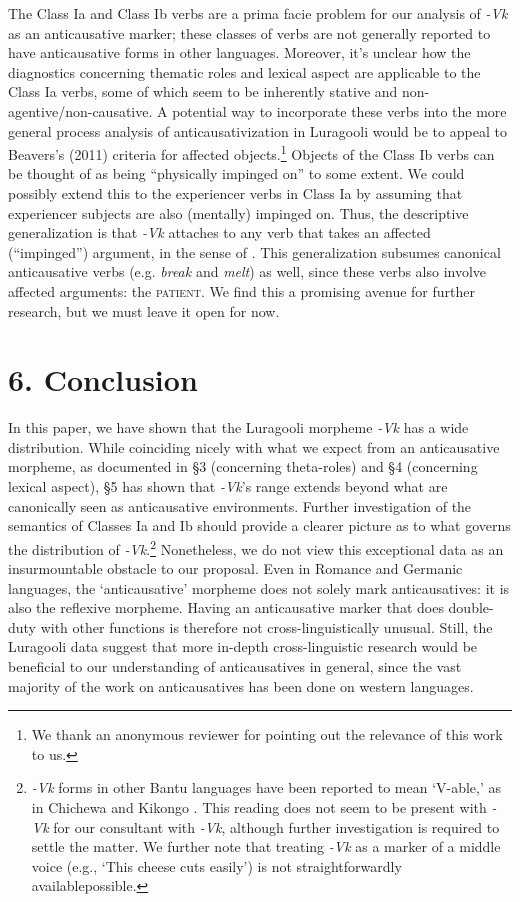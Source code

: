 \documentclass[output=paper]{langsci/langscibook}
\begin{document}
The Class Ia and Class Ib verbs are a prima facie problem for our analysis of \textit{{}-Vk} as an anticausative marker; these classes of verbs are not generally reported to have anticausative forms in other languages. Moreover, it’s unclear how the diagnostics concerning thematic roles and lexical aspect are applicable to the Class Ia verbs, some of which seem to be inherently stative and non-agentive/non-causative. A potential way to incorporate these verbs into the more general process analysis of anticausativization in Luragooli would be to appeal to Beavers’s (2011) criteria for affected objects.\footnote{ We thank an anonymous reviewer for pointing out the relevance of this work to us.}\textsuperscript{ }Objects\textsc{ }of the Class Ib verbs can be thought of as being “physically impinged on” to some extent. We could possibly extend this to the experiencer verbs in Class Ia by assuming that experiencer subjects are also (mentally) impinged on. Thus, the descriptive generalization is that  \textit{{}-Vk} attaches to any verb that takes an affected (“impinged”) argument, in the sense of \citet{Beavers2011}. This generalization subsumes canonical anticausative verbs (e.g. \textit{break} and \textit{melt}) as well, since these verbs also involve affected arguments: the \textsc{patient}. We find this a promising avenue for further research, but we must leave it open for now.

\chapter{6. Conclusion}

In this paper, we have shown that the Luragooli morpheme \textit{{}-Vk} has a wide distribution. While coinciding nicely with what we expect from an anticausative morpheme, as documented in §3 (concerning theta-roles) and §4 (concerning lexical aspect), §5 has shown that \textit{{}-Vk}’s range extends beyond what are canonically seen as anticausative environments. Further investigation of the semantics of Classes Ia and Ib should provide a clearer picture as to what governs the distribution of \textit{{}-Vk}.\footnote{ \textit{{}-Vk} forms in other Bantu languages have been reported to mean ‘V-able,’  as in Chichewa \citep{Simango2009} and Kikongo \citep{Fernando2013}. This reading does not seem to be present with \textit{{}-}\textit{Vk} for our consultant with \textit{{}-Vk}, although further investigation is required to settle the matter. We further note that treating \textit{{}-Vk} as a marker of a middle voice (e.g., ‘This cheese cuts easily’) is not straightforwardly availablepossible.} Nonetheless, we do not view this exceptional data as an insurmountable obstacle to our proposal. Even in Romance and Germanic languages, the ‘anticausative’ morpheme does not solely mark anticausatives: it is also the reflexive morpheme. Having an anticausative marker that does double-duty with other functions is therefore not cross-linguistically unusual. Still, the Luragooli data suggest that more in-depth cross-linguistic research would be beneficial to our understanding of anticausatives in general, since the vast majority of the work on anticausatives has been done on western languages. 
\end{document}
